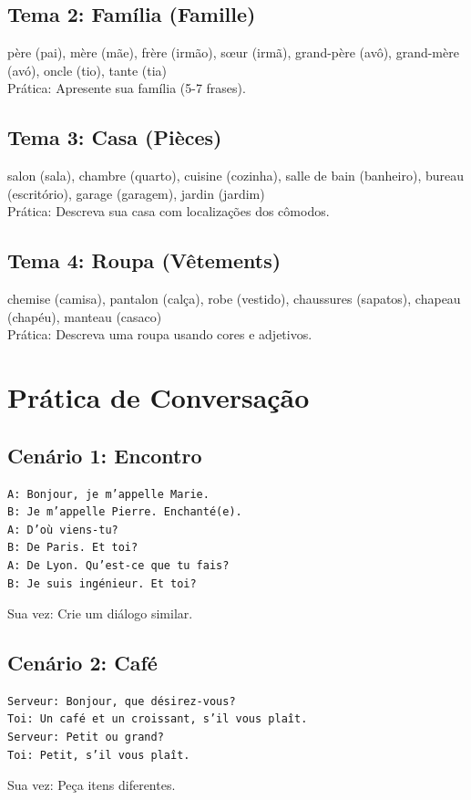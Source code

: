 \documentclass[a4paper,12pt]{article}
\begin{document}
\subsection{Tema 2: Família (Famille)}
père (pai), mère (mãe), frère (irmão), sœur (irmã), grand-père (avô), grand-mère (avó), oncle (tio), tante (tia) \\
Prática: Apresente sua família (5-7 frases).

\subsection{Tema 3: Casa (Pièces)}
salon (sala), chambre (quarto), cuisine (cozinha), salle de bain (banheiro), bureau (escritório), garage (garagem), jardin (jardim) \\
Prática: Descreva sua casa com localizações dos cômodos.

\subsection{Tema 4: Roupa (Vêtements)}
chemise (camisa), pantalon (calça), robe (vestido), chaussures (sapatos), chapeau (chapéu), manteau (casaco) \\
Prática: Descreva uma roupa usando cores e adjetivos.

\section{Prática de Conversação}
\subsection{Cenário 1: Encontro}
\begin{verbatim}
A: Bonjour, je m’appelle Marie.
B: Je m’appelle Pierre. Enchanté(e).
A: D’où viens-tu?
B: De Paris. Et toi?
A: De Lyon. Qu’est-ce que tu fais?
B: Je suis ingénieur. Et toi?
\end{verbatim}
Sua vez: Crie um diálogo similar.

\subsection{Cenário 2: Café}
\begin{verbatim}
Serveur: Bonjour, que désirez-vous?
Toi: Un café et un croissant, s’il vous plaît.
Serveur: Petit ou grand?
Toi: Petit, s’il vous plaît.
\end{verbatim}
Sua vez: Peça itens diferentes.
\end{document}
